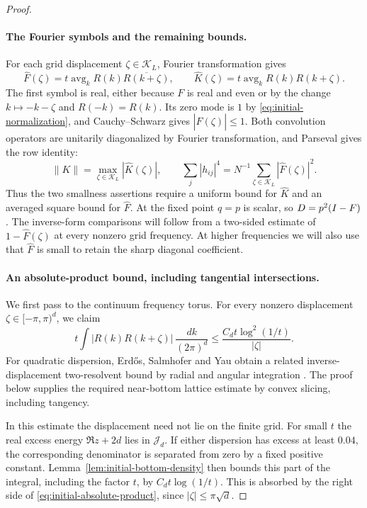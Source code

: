 \begin{proof}
\paragraph{The Fourier symbols and the remaining bounds.}
For each grid displacement $\zeta\in\mathcal K_L$, Fourier transformation gives
\begin{equation}\label{eq:initial-symbols}
 \widehat F(\zeta)
    =t\operatorname{avg}_k R(k)\overline{R(k+\zeta)},\qquad
 \widehat K(\zeta)
    =t\operatorname{avg}_k R(k)R(k+\zeta).
\end{equation}
The first symbol is real, either because $F$ is real and even or by
the change $k\mapsto-k-\zeta$ and $R(-k)=R(k)$. Its zero mode is
$1$ by \eqref{eq:initial-normalization}, and Cauchy--Schwarz gives
$|\widehat F(\zeta)|\le1$. Both convolution operators are unitarily
diagonalized by Fourier transformation, and Parseval gives the row identity:
\[
 \|K\|=\max_{\zeta\in\mathcal K_L}|\widehat K(\zeta)|,\qquad
 \sum_j|h_{ij}|^4
   =N^{-1}\sum_{\zeta\in\mathcal K_L}|\widehat F(\zeta)|^2.
\]
Thus the two smallness assertions require a uniform bound for
$\widehat K$ and an averaged square bound for $\widehat F$.
At the fixed point $q=p$ is scalar, so $D=p^2(I-F)$.
The inverse-form comparisons will follow from a two-sided estimate of
$1-\widehat F(\zeta)$ at every nonzero grid frequency. At higher
frequencies we will also use that $\widehat F$ is small to retain the
sharp diagonal coefficient.

\paragraph{An absolute-product bound, including tangential intersections.}
We first pass to the continuum frequency torus. For every nonzero
displacement $\zeta\in[-\pi,\pi)^d$, we claim
\begin{equation}\label{eq:initial-absolute-product}
 t\int |R(k)R(k+\zeta)|\,\frac{dk}{(2\pi)^d}
 \le\frac{C_dt\log^2(1/t)}{|\zeta|}.
\end{equation}
For quadratic dispersion, Erd\H{o}s, Salmhofer and Yau obtain a related
inverse-displacement two-resolvent bound by radial and angular integration
\cite[author-preprint Appendix~A, Lemma~A.1, equations~(A.2) and~(A.4)]{ErdosSalmhoferYau2008}.
The proof below supplies the required near-bottom lattice estimate by
convex slicing, including tangency.

In this estimate the displacement need not lie on the finite grid.
For small $t$ the real excess energy $\Re z+2d$ lies in $\mathcal J_d$.
If either dispersion has excess at least $0.04$, the corresponding
denominator is separated from zero by a fixed positive constant.
Lemma~\ref{lem:initial-bottom-density} then bounds this part of the
integral, including the factor $t$, by $C_dt\log(1/t)$. This is
absorbed by the right side of \eqref{eq:initial-absolute-product},
since $|\zeta|\le\pi\sqrt d$.


\end{proof}
